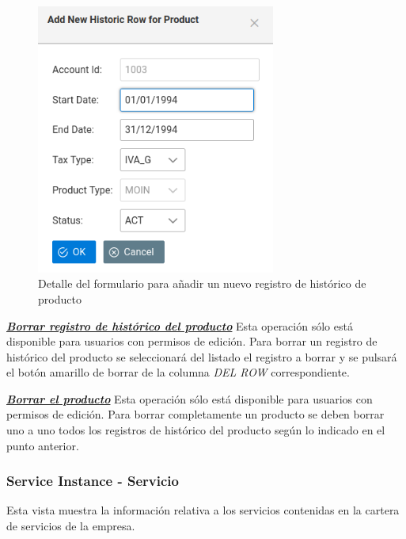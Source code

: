 \begin{figure}[H]
  \centering
  \includegraphics[width=0.70\textwidth]{imaxes/nuevo-historico-producto.png}
  \caption{Detalle del formulario para añadir un nuevo registro de histórico de producto}
  \label{fig:nuevo-historico-producto}
\end{figure}


\underline{\textsl{\textbf{Borrar registro de histórico del producto}}}\newline
Esta operación sólo está disponible para usuarios con permisos de edición.
Para borrar un registro de histórico del producto se seleccionará del listado el registro a borrar y se pulsará el botón amarillo de borrar de la columna \textit{DEL ROW} correspondiente.\newline

\underline{\textsl{\textbf{Borrar el producto}}}\newline
Esta operación sólo está disponible para usuarios con permisos de edición.
Para borrar completamente un producto se deben borrar uno a uno todos los registros de histórico del producto según lo indicado en el punto anterior. 



\subsubsection{Service Instance - Servicio}
\label{sub:service}

Esta vista muestra la información relativa a los servicios contenidas en la cartera de servicios de la empresa.

